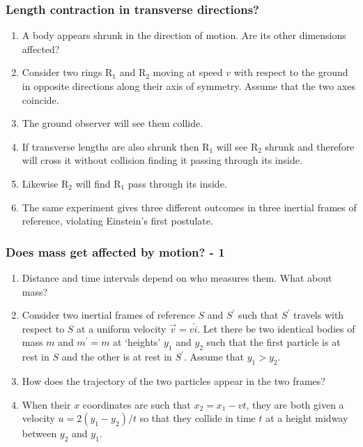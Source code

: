 \documentclass{beamer}
\begin{document}
\begin{frame}
\frametitle{Length contraction in transverse directions?}
\begin{enumerate}
\item A body appears shrunk in the direction of motion. Are its other dimensions
affected?
\item Consider two rings R$_{1}$ and R$_{2}$ moving at speed $v$ with respect
to the ground in opposite directions along their axis of symmetry. Assume that
the two axes coincide.
\item The ground observer will see them collide.
\item If transverse lengths are also shrunk then R$_{1}$ will see R$_{2}$ shrunk
and therefore will cross it without collision finding it passing through its
inside.
\item Likewise R$_{2}$ will find R$_{1}$ pass through its inside.
\item The same experiment gives three different outcomes in three inertial
frames of reference, violating Einstein's first postulate.
\end{enumerate}
\end{frame}

\begin{frame}
\frametitle{Does mass get affected by motion? - 1}
\begin{enumerate}
\item Distance and time intervals depend on who measures them. What about mass?
\item Consider two inertial frames of reference $S$ and $S^\prime$ such that 
$S^\prime$ travels with respect to $S$ at a uniform velocity $\vec{v}=v\hat{i}$.
Let there be two identical bodies of mass $m$ and $m^\prime = m$ at `heights' 
$y_1$ and $y_2$ such that the first particle is at rest in $S$ and the other 
is at rest in $S^\prime$. Assume that $y_1 > y_2$.
\item How does the trajectory of the two particles appear in the two frames?
\item When their $x$ coordinates are such that $x_2 = x_1 - vt$, they are both 
given a velocity $u = 2(y_1 - y_2)/t$ so that they collide in time $t$ at a
height midway between $y_2$ and $y_1$.
\end{enumerate}
\end{frame}
\end{document}
